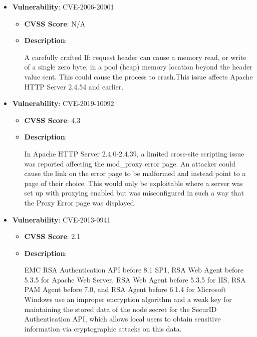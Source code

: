 \documentclass{article}
\begin{document}
\begin{itemize}
        \item \textbf{Vulnerability}: CVE-2006-20001
        \begin{itemize}
            \item \textbf{CVSS Score}:  N/A 
            \item \textbf{Description}:
            \parbox[t]{0.9\linewidth}{
                \ttfamily A carefully crafted If: request header can cause a memory read, or write of a single zero byte, in a pool (heap) memory location beyond the header value sent. This could cause the process to crash.This issue affects Apache HTTP Server 2.4.54 and earlier.
            }
        \end{itemize}
    
        \item \textbf{Vulnerability}: CVE-2019-10092
        \begin{itemize}
            \item \textbf{CVSS Score}:  4.3 
            \item \textbf{Description}:
            \parbox[t]{0.9\linewidth}{
                \ttfamily In Apache HTTP Server 2.4.0-2.4.39, a limited cross-site scripting issue was reported affecting the mod\_proxy error page. An attacker could cause the link on the error page to be malformed and instead point to a page of their choice. This would only be exploitable where a server was set up with proxying enabled but was misconfigured in such a way that the Proxy Error page was displayed.
            }
        \end{itemize}
    
        \item \textbf{Vulnerability}: CVE-2013-0941
        \begin{itemize}
            \item \textbf{CVSS Score}:  2.1 
            \item \textbf{Description}:
            \parbox[t]{0.9\linewidth}{
                \ttfamily EMC RSA Authentication API before 8.1 SP1, RSA Web Agent before 5.3.5 for Apache Web Server, RSA Web Agent before 5.3.5 for IIS, RSA PAM Agent before 7.0, and RSA Agent before 6.1.4 for Microsoft Windows use an improper encryption algorithm and a weak key for maintaining the stored data of the node secret for the SecurID Authentication API, which allows local users to obtain sensitive information via cryptographic attacks on this data.
            }
        \end{itemize}
    

\end{itemize}
\end{document}
